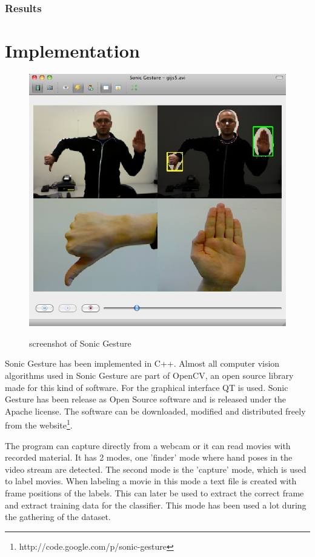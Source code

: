 \subsubsection{Results}


\section{Implementation}
\label{sec:implementation}

\begin{figure}[ht]
\begin{center}
\label{fig:sonicgesture}
\includegraphics[width=0.6\linewidth]{figures/sonicgesture.jpg}
\end{center}
\caption{screenshot of Sonic Gesture}
\end{figure}

Sonic Gesture has been implemented in C++. Almost all computer vision algorithms used in Sonic Gesture are part of OpenCV, an open source library made for this kind of software. For the graphical interface QT is used. Sonic Gesture has been release as Open Source software and is released under the Apache license. The software can be downloaded, modified and distributed freely from the website\footnote{http://code.google.com/p/sonic-gesture}.

The program can capture directly from a webcam or it can read movies with recorded material. It has 2 modes, one 'finder' mode where hand poses in the video stream are detected. The second mode is the 'capture' mode, which is used to label movies. When labeling a movie in this mode a text file is created with frame positions of the labels. This can later be used to extract the correct frame and extract training data for the classifier. This mode has been used a lot during the gathering of the dataset.

